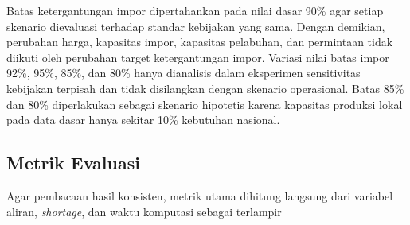 \documentclass{file/TA-ITS}
\theoremstyle{definition}
\theoremstyle{definition}
\theoremstyle{plain}
\begin{document}
Batas ketergantungan impor dipertahankan pada nilai dasar 90\% agar setiap skenario dievaluasi terhadap standar kebijakan yang sama. Dengan demikian, perubahan harga, kapasitas impor, kapasitas pelabuhan, dan permintaan tidak diikuti oleh perubahan target ketergantungan impor. Variasi nilai batas impor 92\%, 95\%, 85\%, dan 80\% hanya dianalisis dalam eksperimen sensitivitas kebijakan terpisah dan tidak disilangkan dengan skenario operasional. Batas 85\% dan 80\% diperlakukan sebagai skenario hipotetis karena kapasitas produksi lokal pada data dasar hanya sekitar 10\% kebutuhan nasional.

\subsection{Metrik Evaluasi}

Agar pembacaan hasil konsisten, metrik utama dihitung langsung dari variabel aliran, \textit{shortage}, dan waktu komputasi sebagai terlampir
\end{document}
